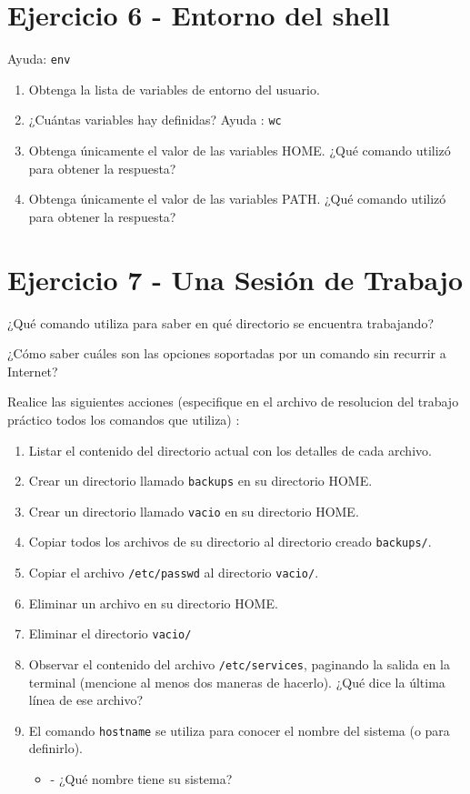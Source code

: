 \documentclass[12pt]{article}
\begin{document}
\section*{Ejercicio 6 - Entorno del shell}
Ayuda: \texttt{env}
\begin{enumerate}
\item Obtenga la lista de variables de entorno del usuario.
\item ¿Cuántas variables hay definidas? Ayuda : \texttt{wc}
\item Obtenga únicamente el valor de las variables HOME. ¿Qué comando utilizó para obtener la respuesta?
\item Obtenga únicamente el valor de las variables PATH. ¿Qué comando utilizó para obtener la respuesta?
\end{enumerate}


\section*{Ejercicio 7 - Una Sesión de Trabajo}

\item ¿Qué comando utiliza para saber en qué directorio se encuentra trabajando?
\item ¿Cómo saber cuáles son las opciones soportadas por un comando sin recurrir a Internet?

\item Realice las siguientes acciones (especifique en el archivo de resolucion del trabajo práctico todos los comandos que utiliza) : 
	\begin{enumerate}
	\item Listar el contenido del directorio actual con los detalles de cada archivo. 
	\item Crear un directorio llamado \texttt{backups} en su directorio HOME.
	\item Crear un directorio llamado \texttt{vacio} en su directorio HOME.
	\item Copiar todos los archivos de su directorio al directorio creado \texttt{backups/}.
	\item Copiar el archivo \texttt{/etc/passwd} al directorio \texttt{vacio/}.
	\item Eliminar un archivo en su directorio HOME.
	\item Eliminar el directorio \texttt{vacio/}
	\item Observar el contenido del archivo \texttt{/etc/services}, paginando la salida en la terminal (mencione al menos dos maneras de hacerlo). ¿Qué dice la última línea de ese archivo?
\item El comando \texttt{hostname} se utiliza para conocer el nombre del sistema (o para definirlo).
\begin{itemize}
\item - ¿Qué nombre tiene su sistema?
\end{itemize}
	\end{enumerate}
 
\end{document}
